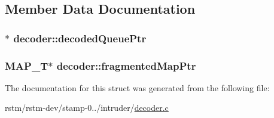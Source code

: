 \subsection{Member Data Documentation}
\hypertarget{structdecoder_a23dea21498aabc512f1b401dc66bb1c4}{
\subsubsection[{decoded\-Queue\-Ptr}]{$\ast$ decoder\-::decoded\-Queue\-Ptr}}\label{structdecoder_a23dea21498aabc512f1b401dc66bb1c4}
\hypertarget{structdecoder_a8f3a47c3becb3b3451cfe04af8c223ca}{
\subsubsection[{fragmented\-Map\-Ptr}]{\setlength{\rightskip}{0pt plus 5cm}M\-A\-P\-\_\-\-T$\ast$ decoder\-::fragmented\-Map\-Ptr}}\label{structdecoder_a8f3a47c3becb3b3451cfe04af8c223ca}


The documentation for this struct was generated from the following file\-:\begin{DoxyCompactItemize}
\item 
rstm/rstm-\/dev/stamp-\/0../intruder/\hyperlink{decoder_8c}{decoder.\-c}\end{DoxyCompactItemize}
